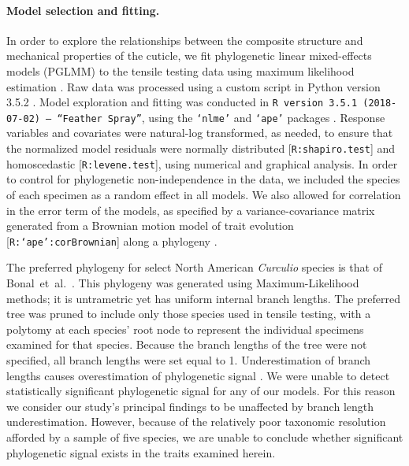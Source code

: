 \documentclass[twocolumn, linenumbers, superscriptaddress, nofootinbib]{revtex4-1}
\begin{document}
			\paragraph*{Model selection and fitting.}
				In order to explore the relationships between the composite structure and mechanical properties of the cuticle, we fit phylogenetic linear mixed-effects models (PGLMM) to the tensile testing data using maximum likelihood estimation \cite{Galecki2013, Hadfield2010, Housworth2004, Stone2011glmm}.
				Raw data was processed using a custom script in Python version 3.5.2 \cite{Python}.
				Model exploration and fitting was conducted in \texttt{R version 3.5.1 (2018-07-02) -- ``Feather Spray''}, using the \texttt{`nlme'} and \texttt{`ape'} packages \cite{Rcite, Nlme, Ape}.
				Response variables and covariates were natural-log transformed, as needed, to ensure that the normalized model residuals were normally distributed [\texttt{R:shapiro.test}] and homoscedastic [\texttt{R:levene.test}], using numerical and graphical analysis.
				In order to control for phylogenetic non-independence in the data, we included the species of each specimen as a random effect in all models.
				We also allowed for correlation in the error term of the models, as specified by a variance-covariance matrix generated from a Brownian motion model of trait evolution [\texttt{R:`ape':corBrownian}] along a phylogeny \cite{Munkemuller2012, Ape}.
				
				The preferred phylogeny for select North American \textit{Curculio} species is that of Bonal~et~al.~\cite{Bonal2016}.
				This phylogeny was generated using Maximum-Likelihood methods; it is untrametric yet has uniform internal branch lengths.
				The preferred tree was pruned to include only those species used in tensile testing, with a polytomy at each species' root node to represent the individual specimens examined for that species.
				Because the branch lengths of the tree were not specified, all branch lengths were set equal to 1.
				Underestimation of branch lengths causes overestimation of phylogenetic signal \cite{Munkemuller2012, Molina2017, Stone2011star}.
				We were unable to detect statistically significant phylogenetic signal for any of our models.
				For this reason we consider our study's principal findings to be unaffected by branch length underestimation.
				However, because of the relatively poor taxonomic resolution afforded by a sample of five species, we are unable to conclude whether significant phylogenetic signal exists in the traits examined herein.
				
\end{document}
